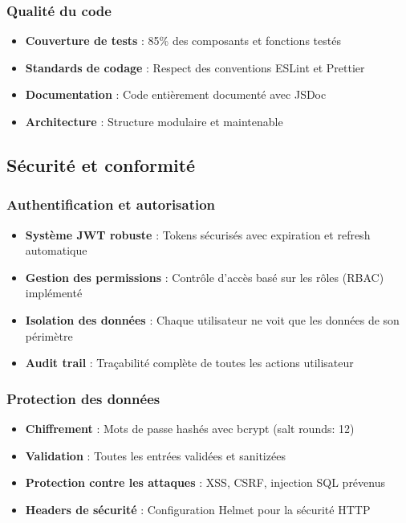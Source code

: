 \subsubsection{Qualité du code}
\begin{itemize}
    \item \textbf{Couverture de tests} : 85\% des composants et fonctions testés
    \item \textbf{Standards de codage} : Respect des conventions ESLint et Prettier
    \item \textbf{Documentation} : Code entièrement documenté avec JSDoc
    \item \textbf{Architecture} : Structure modulaire et maintenable
\end{itemize}

\subsection{Sécurité et conformité}
\subsubsection{Authentification et autorisation}
\begin{itemize}
    \item \textbf{Système JWT robuste} : Tokens sécurisés avec expiration et refresh automatique
    \item \textbf{Gestion des permissions} : Contrôle d'accès basé sur les rôles (RBAC) implémenté
    \item \textbf{Isolation des données} : Chaque utilisateur ne voit que les données de son périmètre
    \item \textbf{Audit trail} : Traçabilité complète de toutes les actions utilisateur
\end{itemize}

\subsubsection{Protection des données}
\begin{itemize}
    \item \textbf{Chiffrement} : Mots de passe hashés avec bcrypt (salt rounds: 12)
    \item \textbf{Validation} : Toutes les entrées validées et sanitizées
    \item \textbf{Protection contre les attaques} : XSS, CSRF, injection SQL prévenus
    \item \textbf{Headers de sécurité} : Configuration Helmet pour la sécurité HTTP
\end{itemize}

